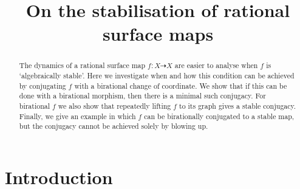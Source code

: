 \documentclass[11pt, final]{amsart}
\title[On the stabilisation of rational surface maps]{On the stabilisation of rational surface maps}
\author{\mylongname}
\newcommand{\dashto}{\dashrightarrow}
\begin{document}
\begin{abstract}



The dynamics of a rational surface map $f : X \dashto X$ are easier to analyse when $f$ is `algebraically stable'.  Here we investigate when and how this condition can be achieved by conjugating $f$ with a birational change of coordinate.  We show that if this can be done with a birational morphism, then there is a minimal such conjugacy. For birational $f$ we also show that repeatedly lifting $f$ to its graph gives a stable conjugacy. Finally, we give an example in which $f$ can be birationally conjugated to a stable map, but the conjugacy cannot be achieved solely by blowing up.
\end{abstract}

\maketitle

\vspace{-5mm}
\section{Introduction}
\end{document}
